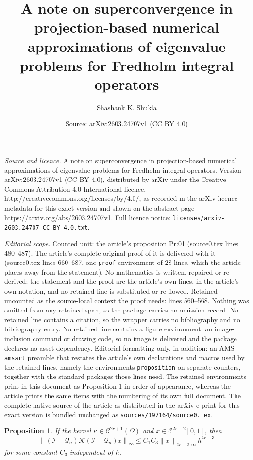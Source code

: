 \documentclass[10pt,a4paper]{amsart}
\title{A note on superconvergence in projection-based numerical approximations of eigenvalue problems for Fredholm integral operators}
\author{Shashank K. Shukla}
\date{Source: arXiv:2603.24707v1 (CC BY 4.0)}
\newtheorem{proposition}{Proposition}
\newcommand{\norm}[1]{\left\lVert #1\right\rVert}
\begin{document}
\maketitle

\noindent\emph{Source and licence.} A note on superconvergence in projection-based numerical approximations of eigenvalue problems for Fredholm integral operators. Version arXiv:2603.24707v1 (CC BY 4.0), distributed by arXiv under the Creative Commons Attribution 4.0 International licence, http://creativecommons.org/licenses/by/4.0/, as recorded in the arXiv licence metadata for this exact version and shown on the abstract page https://arxiv.org/abs/2603.24707v1. Full licence notice: \texttt{licenses/arxiv-2603.24707-CC-BY-4.0.txt}.\par\smallskip

\noindent\textit{Editorial scope.} Counted unit: the article's proposition Pr:01 (source0.tex lines 480--487). The article's complete original proof of it is delivered with it (source0.tex lines 660--687, one \texttt{proof} environment of 28 lines, which the article places away from the statement). No mathematics is written, repaired or re-derived: the statement and the proof are the article's own lines, in the article's own notation, and no retained line is substituted or re-flowed.  Retained uncounted as the source-local context the proof needs: lines 560--568.  Nothing was omitted from any retained span, so the package carries no omission record.  No retained line contains a citation, so the wrapper carries no bibliography and no bibliography entry.  No retained line contains a figure environment, an image-inclusion command or drawing code, so no image is delivered and the package declares no asset dependency.  Editorial formatting only, in addition: an AMS \texttt{amsart} preamble that restates the article's own declarations and macros used by the retained lines, namely the environments \texttt{proposition} on separate counters, together with the standard packages those lines need.  The retained environments print in this document as Proposition 1 in order of appearance, whereas the article prints the same items with the numbering of its own full document.  The complete native source of the article as distributed in the arXiv e-print for this exact version is bundled unchanged as \texttt{sources/197164/source0.tex}.
\begin{proposition} \label{Pr:02}
	If the kernel $\kappa \in \mathcal{C}^{2r+1}(\Omega)$
	and $x \in \mathcal{C}^{2r+2}[0,1]$, then
	\[
	\norm{(\mathcal{I}-\mathcal{Q}_n)\mathcal{K}(\mathcal{I}-\mathcal{Q}_n)x}_\infty
	\le C_1C_3 \norm{x}_{2r+2,\infty}\,h^{4r+3}
	\]
	for some constant $C_3$ independent of $h$.
\end{proposition}
\end{document}
